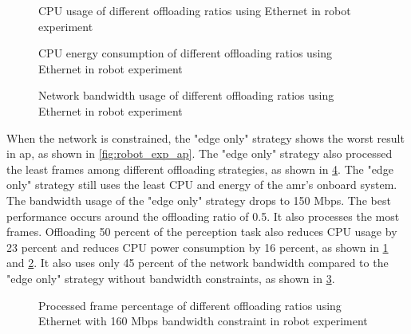 \begin{figure}
    \centering
    
    \caption{CPU usage of different offloading ratios using Ethernet in robot experiment}
    \label{fig:robot_exp_cpu_usage}
\end{figure}


\begin{figure}
    \centering
    
    \caption{CPU energy consumption of different offloading ratios using Ethernet in robot experiment}
    \label{fig:robot_exp_energy}
\end{figure}

\begin{figure}
    \centering
    
    \caption{Network bandwidth usage of different offloading ratios using Ethernet in robot experiment}
    \label{fig:robot_exp_network_bandwidth}
\end{figure}

When the network is constrained, the "edge only" strategy shows the worst result in \gls{ap}, as shown in \cref{fig:robot_exp_ap}. The "edge only" strategy also processed the least frames among different offloading strategies, as shown in \cref{fig:robot_exp_processed_frame_percentage_160}. The "edge only" strategy still uses the least CPU and energy of the \gls{amr}'s onboard system. The bandwidth usage of the "edge only" strategy drops to 150 Mbps. The best performance occurs around the offloading ratio of 0.5. It also processes the most frames. Offloading 50 percent of the perception task also reduces CPU usage by 23 percent and reduces CPU power consumption by 16 percent, as shown in \cref{fig:robot_exp_cpu_usage} and \cref{fig:robot_exp_energy}. It also uses only 45 percent of the network bandwidth compared to the "edge only" strategy without bandwidth constraints, as shown in \cref{fig:robot_exp_network_bandwidth}. 

\begin{figure}
    \centering
        
    \caption{Processed frame percentage of different offloading ratios using Ethernet with 160 Mbps bandwidth constraint in robot experiment}
    \label{fig:robot_exp_processed_frame_percentage_160}
\end{figure}

